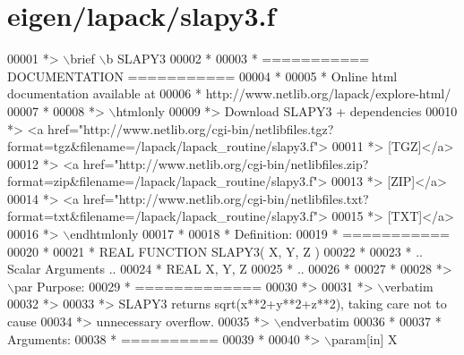 \hypertarget{eigen_2lapack_2slapy3_8f_source}{}\section{eigen/lapack/slapy3.f}
\label{eigen_2lapack_2slapy3_8f_source}

\begin{DoxyCode}
00001 \textcolor{comment}{*> \(\backslash\)brief \(\backslash\)b SLAPY3}
00002 \textcolor{comment}{*}
00003 \textcolor{comment}{*  =========== DOCUMENTATION ===========}
00004 \textcolor{comment}{*}
00005 \textcolor{comment}{* Online html documentation available at }
00006 \textcolor{comment}{*            http://www.netlib.org/lapack/explore-html/ }
00007 \textcolor{comment}{*}
00008 \textcolor{comment}{*> \(\backslash\)htmlonly}
00009 \textcolor{comment}{*> Download SLAPY3 + dependencies }
00010 \textcolor{comment}{*> <a
       href="http://www.netlib.org/cgi-bin/netlibfiles.tgz?format=tgz&filename=/lapack/lapack\_routine/slapy3.f"> }
00011 \textcolor{comment}{*> [TGZ]</a> }
00012 \textcolor{comment}{*> <a
       href="http://www.netlib.org/cgi-bin/netlibfiles.zip?format=zip&filename=/lapack/lapack\_routine/slapy3.f"> }
00013 \textcolor{comment}{*> [ZIP]</a> }
00014 \textcolor{comment}{*> <a
       href="http://www.netlib.org/cgi-bin/netlibfiles.txt?format=txt&filename=/lapack/lapack\_routine/slapy3.f"> }
00015 \textcolor{comment}{*> [TXT]</a>}
00016 \textcolor{comment}{*> \(\backslash\)endhtmlonly }
00017 \textcolor{comment}{*}
00018 \textcolor{comment}{*  Definition:}
00019 \textcolor{comment}{*  ===========}
00020 \textcolor{comment}{*}
00021 \textcolor{comment}{*       REAL             FUNCTION SLAPY3( X, Y, Z )}
00022 \textcolor{comment}{* }
00023 \textcolor{comment}{*       .. Scalar Arguments ..}
00024 \textcolor{comment}{*       REAL               X, Y, Z}
00025 \textcolor{comment}{*       ..}
00026 \textcolor{comment}{*  }
00027 \textcolor{comment}{*}
00028 \textcolor{comment}{*> \(\backslash\)par Purpose:}
00029 \textcolor{comment}{*  =============}
00030 \textcolor{comment}{*>}
00031 \textcolor{comment}{*> \(\backslash\)verbatim}
00032 \textcolor{comment}{*>}
00033 \textcolor{comment}{*> SLAPY3 returns sqrt(x**2+y**2+z**2), taking care not to cause}
00034 \textcolor{comment}{*> unnecessary overflow.}
00035 \textcolor{comment}{*> \(\backslash\)endverbatim}
00036 \textcolor{comment}{*}
00037 \textcolor{comment}{*  Arguments:}
00038 \textcolor{comment}{*  ==========}
00039 \textcolor{comment}{*}
00040 \textcolor{comment}{*> \(\backslash\)param[in] X}

\end{DoxyCode}
